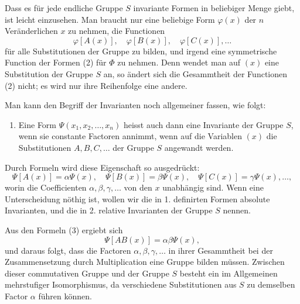 \documentclass[11pt]{article}
\begin{document}
Dass es für jede endliche Gruppe $S$ invariante Formen in beliebiger Menge giebt, ist leicht einzusehen. Man braucht nur eine beliebige Form $\varphi(x)$ der $n$ Veränderlichen $x$ zu nehmen, die Functionen
\begin{equation}
\varphi[A(x)],\quad \varphi[B(x)],\quad \varphi[C(x)],\ldots
\tag{2}
\end{equation}
für alle Substitutionen der Gruppe zu bilden, und irgend eine symmetrische Function der Formen (2) für $\Phi$ zu nehmen. Denn wendet man auf $(x)$ eine Substitution der Gruppe $S$ an, so ändert sich die Gesammtheit der Functionen (2) nicht; es wird nur ihre Reihenfolge eine andere.

Man kann den Begriff der Invarianten noch allgemeiner fassen, wie folgt:
\begin{enumerate}[label=\arabic*.,leftmargin=2.2em,start=2]
\item Eine Form $\Psi(x_1,x_2,\ldots,x_n)$ heisst auch dann eine Invariante der Gruppe $S$, wenn sie constante Factoren annimmt, wenn auf die Variablen $(x)$ die Substitutionen $A,B,C,\ldots$ der Gruppe $S$ angewandt werden.
\end{enumerate}
Durch Formeln wird diese Eigenschaft so ausgedrückt:
\begin{equation}
\Psi[A(x)]=\alpha\Psi(x),\quad
\Psi[B(x)]=\beta\Psi(x),\quad
\Psi[C(x)]=\gamma\Psi(x),\ldots,
\tag{3}
\end{equation}
worin die Coefficienten $\alpha,\beta,\gamma,\ldots$ von den $x$ unabhängig sind. Wenn eine Unterscheidung nöthig ist, wollen wir die in 1. definirten Formen absolute Invarianten, und die in 2. relative Invarianten der Gruppe $S$ nennen.

Aus den Formeln (3) ergiebt sich
\begin{equation}
\Psi[AB(x)]=\alpha\beta\Psi(x),
\tag{4}
\end{equation}
und daraus folgt, dass die Factoren $\alpha,\beta,\gamma,\ldots$ in ihrer Gesammtheit bei der Zusammensetzung durch Multiplication eine Gruppe bilden müssen. Zwischen dieser commutativen Gruppe und der Gruppe $S$ besteht ein im Allgemeinen mehrstufiger Isomorphismus, da verschiedene Substitutionen aus $S$ zu demselben Factor $\alpha$ führen können.
\end{document}
